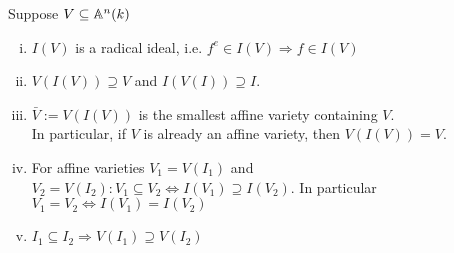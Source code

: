 \begin{Bem}
Suppose $V \subseteq \mathbb{A}^n(k)$
\begin{enumerate}[i)]
\item $I(V)$ is a radical ideal, i.e. $f^e \in I(V) \Rightarrow f \in I(V)$
\item $V(I(V)) \supseteq V$ and $I(V(I)) \supseteq I$.
\item $\bar{V}:=V(I(V))$ is the smallest affine variety containing $V$.\\
In particular, if $V$ is already an affine variety, then $V(I(V))=V$.
\item For affine varieties $V_1=V(I_1)$ and $V_2=V(I_2): V_1 \subseteq V_2 \iff I(V_1) \supseteq I(V_2)$.
In particular $V_1=V_2 \iff I(V_1)=I(V_2)$
\item $I_1 \subseteq I_2 \Rightarrow V(I_1) \supseteq V(I_2)$
\end{enumerate}
\end{Bem}
